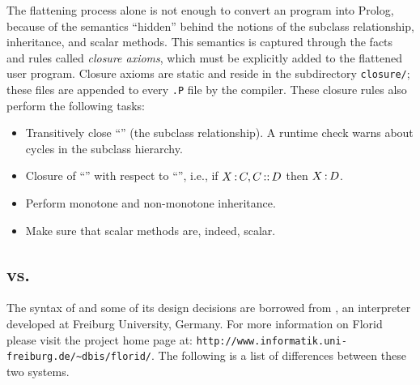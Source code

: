 \documentclass[11pt]{report}
\begin{document}
The flattening process alone is not enough to convert an \fl program
into Prolog, because of the semantics ``hidden'' behind the notions of
the subclass relationship, inheritance, and scalar methods. This semantics
is captured through the facts and rules called \emph{closure axioms}, which
must be explicitly added to the flattened user program.  Closure axioms are
static and reside in the subdirectory \texttt{closure/}; these files are
appended to every {\tt *.P} file by the \FLORA compiler. These closure
rules also perform the following tasks:

\begin{itemize}
\item Transitively close ``\subcl'' (the subclass relationship).  A
  runtime check warns about cycles in the subclass hierarchy.
\item Closure of ``\isa'' with respect to ``\subcl'', i.e., if $X\,{\bf{:}}\, C,
  C\,{\bf{::}}\, D$ then $X\,{\bf{:}}\, D$.
\item Perform monotone and non-monotone inheritance.
\item Make sure that scalar methods are, indeed, scalar.
\end{itemize}


\subsection{\FLORA vs. \FLORID}

The syntax of \FLORA and some of its design decisions are borrowed from
\FLORID, an \fl interpreter developed at Freiburg University, Germany.
For more information on Florid please visit the project home page at:
\verb|http://www.informatik.uni-freiburg.de/~dbis/florid/|. The following
is a list of differences between these two systems.
\end{document}
